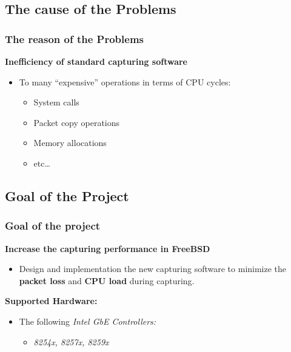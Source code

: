 \documentclass{beamer}
\begin{document}
\subsection*{The cause of the Problems}
\begin{frame}
\frametitle{The reason of the Problems}
\textbf{Inefficiency of standard capturing software}\newline
\begin{itemize}
	\item To many ``expensive'' operations in terms of CPU cycles: 
\begin{itemize}
			\item System calls
			\item Packet copy operations
			\item Memory allocations
			\item etc\ldots\newline
\end{itemize}
\end{itemize}
\end{frame}

\subsection*{Goal of the Project}
\begin{frame}
\frametitle{Goal of the project}
\textbf{Increase the capturing performance in FreeBSD}
	\begin{itemize}
		\item Design and implementation the new capturing software to
			minimize the \textbf{packet loss} and \textbf{CPU load} during capturing. \newline \newline
	\end{itemize}
\textbf{Supported Hardware:}
\begin{itemize}
	\item The following \emph{Intel GbE Controllers:}
		\begin{itemize}
			\item \small{\emph{8254x, 8257x, 8259x}}
		\end{itemize}
\end{itemize}
\end{frame}
\end{document}
